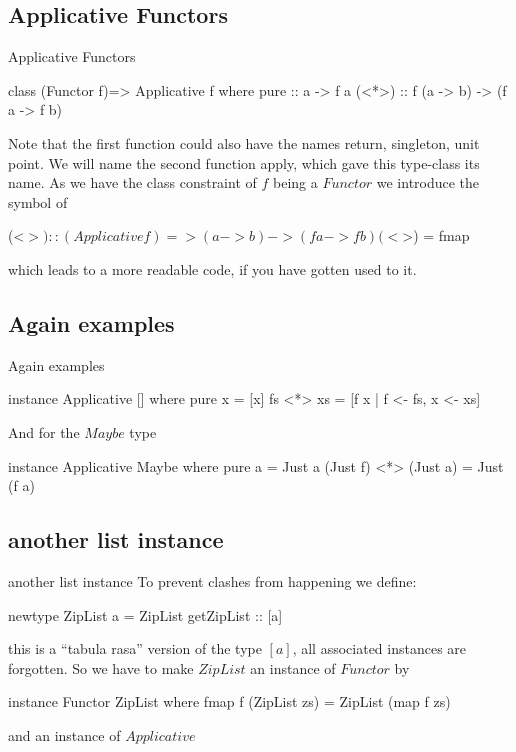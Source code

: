 \documentclass{beamer}
\begin{document}
\subsection{Applicative Functors}
\begin{frame}[fragile]{Applicative Functors}
\begin{code}
    class (Functor f)=> Applicative f where
        pure  :: a -> f a
        (<*>) :: f (a -> b) -> (f a -> f b)
\end{code}
Note that the first function could also have the names return, singleton, unit
point. We will name the second function apply, which gave this type-class its
name. As we have the class constraint of $f$ being a $Functor$ we introduce the
symbol of
\begin{code}
    (<$>) ::(Applicative f) => (a -> b) -> (f a -> f b)
    (<$>)  = fmap
\end{code}
which leads to a more readable code, if you have gotten used to it.
\end{frame}

\subsection{Again examples}
\begin{frame}[fragile]{Again examples}
\begin{code}
    instance Applicative [] where
        pure x = [x]
        fs <*> xs = [f x | f <- fs, x <- xs]
\end{code}
And for the $Maybe$ type
\begin{code}
    instance Applicative Maybe where
        pure a = Just a
        (Just f) <*> (Just a) = Just (f a)
\end{code}
\end{frame}

\subsection{another list instance}
\begin{frame}[fragile]{another list instance}
To prevent clashes from happening we define:
\begin{code}
    newtype ZipList a = ZipList { getZipList :: [a] }
\end{code}
this is a “tabula rasa” version of the type $[a]$, all associated instances are
forgotten. So we have to make $ZipList$ an instance of $Functor$ by
\begin{code}
    instance Functor ZipList where
        fmap f (ZipList zs) = ZipList (map f zs)
\end{code}
and an instance of $Applicative$
\end{frame}
\end{document}

